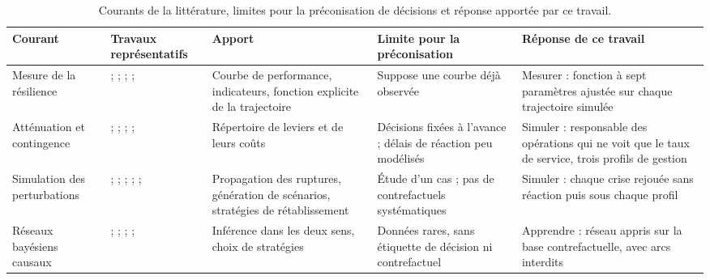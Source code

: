 \begin{table}[htbp]
\caption{Courants de la littérature, limites pour la préconisation de décisions et réponse apportée par ce travail.}
\label{tab:synthese}
\footnotesize
\begin{tabularx}{\textwidth}{@{}P{1.9cm}P{3.3cm}LLL@{}}
\toprule
\textbf{Courant} & \textbf{Travaux représentatifs} & \textbf{Apport} & \textbf{Limite pour la préconisation} & \textbf{Réponse de ce travail} \\
\midrule
Mesure de la résilience
  & \citealp{bruneau2003}; \citealp{henry2012}; \citealp{spiegler2012}; \citealp{behzadi2020}; \citealp{rahiel2026in4pl}
  & Courbe de performance, indicateurs, fonction explicite de la trajectoire
  & Suppose une courbe déjà observée
  & Mesurer : fonction à sept paramètres ajustée sur chaque trajectoire simulée \\
\addlinespace
Atténuation et contingence
  & \citealp{tang2006}; \citealp{tomlin2006}; \citealp{lucker2019}; \citealp{ivanov2016tre}; \citealp{aldrighetti2021}
  & Répertoire de leviers et de leurs coûts
  & Décisions fixées à l'avance ; délais de réaction peu modélisés
  & Simuler : responsable des opérations qui ne voit que le taux de service, trois profils de gestion \\
\addlinespace
Simulation des perturbations
  & \citealp{schmitt2012}; \citealp{ivanov2017}; \citealp{macdonald2018}; \citealp{klibi2012ejor}; \citealp{ramzy2022}; \citealp{zhang2026isomorph}
  & Propagation des ruptures, génération de scénarios, stratégies de rétablissement
  & Étude d'un cas ; pas de contrefactuels systématiques
  & Simuler : chaque crise rejouée sans réaction puis sous chaque profil \\
\addlinespace
Réseaux bayésiens causaux
  & \citealp{garvey2015}; \citealp{ojha2018}; \citealp{qazi2018}; \citealp{hosseiniivanov2020}; \citealp{rahiel2026codit}
  & Inférence dans les deux sens, choix de stratégies
  & Données rares, sans étiquette de décision ni contrefactuel
  & Apprendre : réseau appris sur la base contrefactuelle, avec arcs interdits \\
\bottomrule
\end{tabularx}
\end{table}
